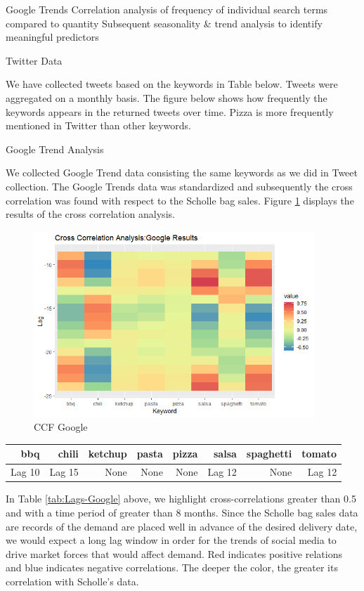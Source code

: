 \documentclass[12pt,oneside]{chicagocapstone}
\begin{document}
Google Trends Correlation analysis of frequency of individual search
terms compared to quantity Subsequent seasonality \& trend analysis to
identify meaningful predictors

Twitter Data

We have collected tweets based on the keywords in Table below. Tweets
were aggregated on a monthly basis. The figure below shows how
frequently the keywords appears in the returned tweets over time. Pizza
is more frequently mentioned in Twitter than other keywords.

Google Trend Analysis

We collected Google Trend data consisting the same keywords as we did in
Tweet collection. The Google Trends data was standardized and
subsequently the cross correlation was found with respect to the Scholle
bag sales. Figure \ref{fig:ccf-google} displays the results of the cross
correlation analysis.
\begin{figure}

{\centering \includegraphics[width=400px]{figure/CCF_Google_Results} 

}

\caption{CCF Google}\label{fig:ccf-google}
\end{figure}
\begin{longtable}[]{@{}rrrrrrrr@{}}
\toprule
bbq & chili & ketchup & pasta & pizza & salsa & spaghetti &
tomato\tabularnewline
\midrule
\endhead
Lag 10 & Lag 15 & None & None & None & Lag 12 & None & Lag
12\tabularnewline
\bottomrule
\end{longtable}
In Table \ref{tab:Lags-Google} above, we highlight cross-correlations
greater than 0.5 and with a time period of greater than 8 months. Since
the Scholle bag sales data are records of the demand are placed well in
advance of the desired delivery date, we would expect a long lag window
in order for the trends of social media to drive market forces that
would affect demand. Red indicates positive relations and blue indicates
negative correlations. The deeper the color, the greater its correlation
with Scholle's data.
\end{document}
